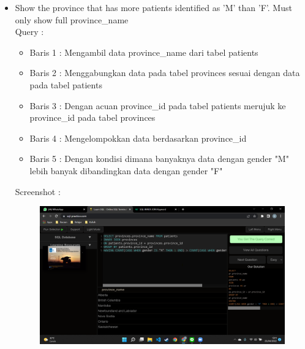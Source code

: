 \documentclass[]{article}
\begin{document}
\begin{itemize}
        \item Show the province that has more patients identified as 'M' than 'F'. Must only show full province\_name
        \\Query :
        
        \begin{itemize}
            \item Baris 1 : Mengambil data province\_name dari tabel patients
            \item Baris 2 : Menggabungkan data pada tabel provinces sesuai dengan data pada tabel patients
            \item Baris 3 : Dengan acuan province\_id pada tabel patients merujuk ke province\_id pada tabel provinces
            \item Baris 4 : Mengelompokkan data berdasarkan province\_id
            \item Baris 5 : Dengan kondisi dimana banyaknya data dengan gender "M" lebih banyak dibandingkan data dengan gender "F"
        \end{itemize}
        Screenshot :
        \begin{figure}[h]
            \includegraphics[scale=0.3]{./Screenshot/Hard-6.png}
            \centering
        \end{figure}


\end{itemize}
\end{document}
